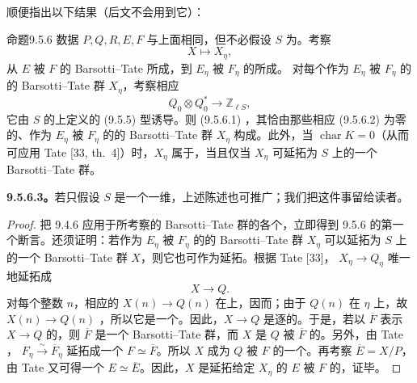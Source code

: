 顺便指出以下结果（后文不会用到它）：
\begin{SGAresult}{命题}{9.5.6}
数据 $P,Q,R,E,F$ 与上面相同，但不必假设 $S$ 为。考察
\begin{equation}\tag{9.5.6.1}
 X\longmapsto X_\eta,
\end{equation}
从 $E$ 被 $F$ 的 Barsotti--Tate 所成，到 $E_\eta$ 被 $F_\eta$ 的所成。
对每个作为 $E_\eta$ 被 $F_\eta$ 的的 Barsotti--Tate 群 $X_\eta$，考察相应
\begin{equation}\tag{9.5.6.2}
 Q_0\otimes Q_0^*\longrightarrow\mathbb Z_{\ell S},
\end{equation}
它由 $S$ 的上定义的 (9.5.5) 型诱导。则 (9.5.6.1) ，其恰由那些相应 (9.5.6.2) 为零的、作为 $E_\eta$ 被 $F_\eta$ 的的 Barsotti--Tate 群 $X_\eta$ 构成。此外，当 $\operatorname{char}K=0$（从而可应用 Tate  [33, th.~4]）时，$X_\eta$ 属于，当且仅当 $X_\eta$ 可延拓为 $S$ 上的一个 Barsotti--Tate 群。
\end{SGAresult}

\textbf{9.5.6.3。}若只假设 $S$ 是一个一维，上述陈述也可推广；我们把这件事留给读者。
\begin{proof}
把 9.4.6 应用于所考察的 Barsotti--Tate 群的各个，立即得到 9.5.6 的第一个断言。还须证明：若作为 $E_\eta$ 被 $F_\eta$ 的的 Barsotti--Tate 群 $X_\eta$ 可以延拓为 $S$ 上的一个 Barsotti--Tate 群 $X$，则它也可作为延拓。根据 Tate  [33]， $X_\eta\to Q_\eta$ 唯一地延拓成
\[
 X\longrightarrow Q.
\]
对每个整数 $n$，相应的 $X(n)\to Q(n)$ 在上，因而；由于 $Q(n)$ 在 $\eta$ 上，故 $X(n)\to Q(n)$ ，所以它是一个。因此，$X\to Q$ 是逐的。于是，若以 $\overline F$ 表示 $X\to Q$ 的，则 $\overline F$ 是一个 Barsotti--Tate 群，而 $X$ 是 $Q$ 被 $\overline F$ 的。另外，由 Tate ， $F_\eta\xrightarrow{\sim}\overline F_\eta$ 延拓成一个 $F\simeq\overline F$。所以 $X$ 成为 $Q$ 被 $F$ 的一个。再考察 $\overline E=X/P$，由 Tate 又可得一个 $E\simeq\overline E$。因此，$X$ 是延拓给定 $X_\eta$ 的 $E$ 被 $F$ 的，证毕。
\end{proof}

